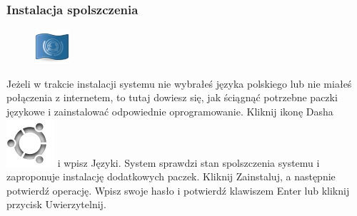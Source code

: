 \subsubsection{Instalacja spolszczenia}
\begin{figure}
	\vspace{-10pt}
	\includegraphics[width=\linewidth]{images/pierwsze_uruchomienie_lang1.png}
\end{figure}

Jeżeli w trakcie instalacji systemu nie wybrałeś języka polskiego lub nie miałeś połączenia z internetem, to tutaj dowiesz się, jak ściągnąć potrzebne paczki językowe i zainstalować odpowiednie oprogramowanie.
Kliknij ikonę Dasha \includegraphics[scale=0.35]{images/ikony_dash.png} i wpisz \textcolor{ubuntu_orange}{Języki}. System sprawdzi stan spolszczenia systemu i zaproponuje instalację dodatkowych paczek. Kliknij \textcolor{ubuntu_orange}{Zainstaluj}, a następnie potwierdź operację. Wpisz swoje hasło i potwierdź klawiszem Enter lub kliknij przycisk \textcolor{ubuntu_orange}{Uwierzytelnij}.

